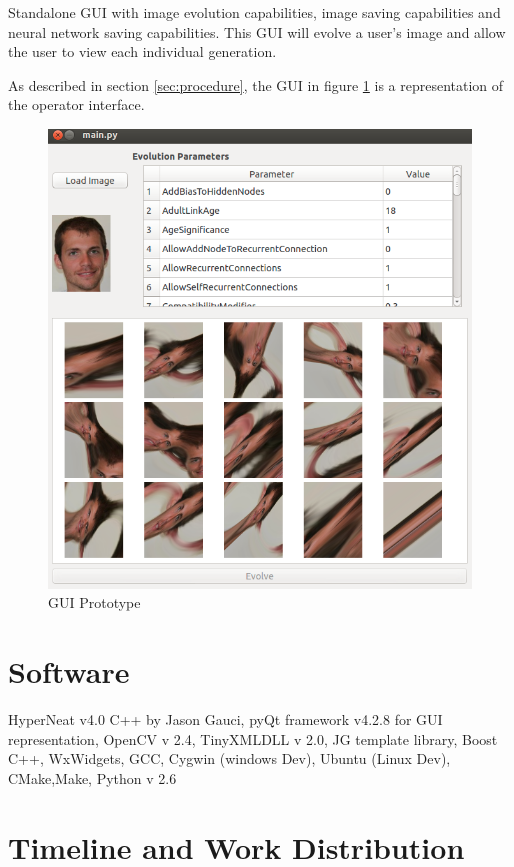 \documentclass[a4paper,10pt]{article}
\begin{document}
Standalone GUI with image evolution capabilities, image saving capabilities and neural network saving capabilities. This GUI will evolve a user’s image and allow the user to view each individual generation.

As described in section \ref{sec:procedure}, the GUI in figure \ref{fig:gui} is a representation of the operator interface.

\begin{figure}
    \includegraphics[width=\textwidth]{rec/gui.png}
    \caption{GUI Prototype}
    \label{fig:gui}
\end{figure}

\section{Software}

HyperNeat v4.0 C++ by Jason Gauci, pyQt framework v4.2.8 for GUI representation, OpenCV v 2.4, TinyXMLDLL v 2.0, JG template library, Boost C++, WxWidgets, GCC, Cygwin (windows Dev), Ubuntu (Linux Dev), CMake,Make, Python v 2.6

\section{Timeline and Work Distribution}
\end{document}
